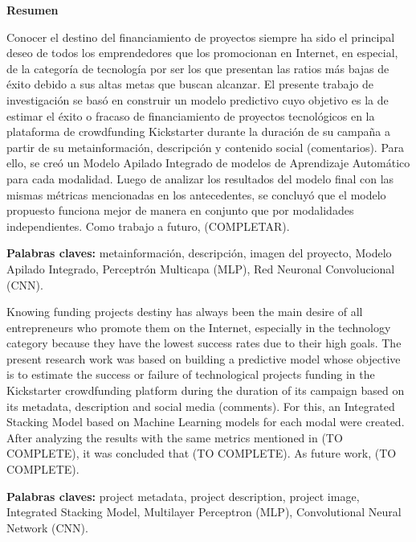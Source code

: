 \thispagestyle{plain}
\begin{center}
	{\Large \bfseries  Resumen}
\end{center}
\vspace{0.5cm}

Conocer el destino del financiamiento de proyectos siempre ha sido el principal deseo de todos los emprendedores que los promocionan en Internet, en especial, de la categoría de tecnología por ser los que presentan las ratios más bajas de éxito debido a sus altas metas que buscan alcanzar. El presente trabajo de investigación se basó en construir un modelo predictivo cuyo objetivo es la de estimar el éxito o fracaso de financiamiento de proyectos tecnológicos en la plataforma de crowdfunding Kickstarter durante la duración de su campaña a partir de su metainformación, descripción y contenido social (comentarios). Para ello, se creó un Modelo Apilado Integrado de modelos de Aprendizaje Automático para cada modalidad. Luego de analizar los resultados del modelo final con las mismas métricas mencionadas en los antecedentes, se concluyó que el modelo propuesto funciona mejor de manera en conjunto que por modalidades independientes. Como trabajo a futuro, (COMPLETAR).

\textbf{Palabras claves: } metainformación, descripción, imagen del proyecto, Modelo Apilado Integrado, Perceptrón Multicapa (MLP), Red Neuronal Convolucional (CNN).

\vspace{0.5cm}
Knowing funding projects destiny has always been the main desire of all entrepreneurs who promote them on the Internet, especially in the technology category because they have the lowest success rates due to their high goals. The present research work was based on building a predictive model whose objective is to estimate the success or failure of technological projects funding in the Kickstarter crowdfunding platform during the duration of its campaign based on its metadata, description and social media (comments). For this, an Integrated Stacking Model based on Machine Learning models for each modal were created. After analyzing the results with the same metrics mentioned in (TO COMPLETE), it was concluded that (TO COMPLETE). As future work, (TO COMPLETE).

\textbf{Palabras claves: } project metadata, project description, project image, Integrated Stacking Model, Multilayer Perceptron (MLP), Convolutional Neural Network (CNN).
